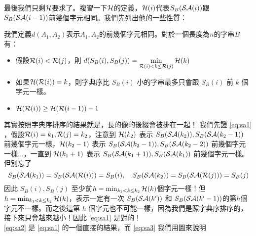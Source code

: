 \documentclass[a4paper,12pt]{book}
\begin{document}
最後我們只剩$\hei$要求了。複習一下$\hei$的定義，$\hei(i)$代表$S_{B}(\sa(i))$跟$S_{B}(\sa(i-1))$前幾個字元相同。我們先列出他的一些性質：
\begin{theorem}[定理]
  我們定義$d(A_1, A_2)$表示$A_1, A_2$的前幾個字元相同。對於一個長度為$n$的字串$B$有：
  \begin{itemize}
    \item 假設$\rank(i) < \rank(j)$，則 $ d(S_B(i), S_B(j)) = \min\limits_{\rank(i) < k \leq \rank(j)} \hei(k) $ \listeqn \label{eq:sa1}
    \item 如果$\hei(\rank(i)) = k$，則字典序比 $S_B(i)$ 小的字串最多只會跟 $S_B(i)$ 前 $k$ 個字元一樣。 \listeqn \label{eq:sa2}
    \item $\hei(\rank(i)) \geq \hei(\rank(i-1)) - 1$ \listeqn \label{eq:sa3}
  \end{itemize}
\end{theorem}
其實按照字典序排序的結果就是，長的像的後綴會被排在一起！
我們先證 \eqref{eq:sa1} ，假設$\rank(i) = k_1, \rank(j) = k_2$，注意到
$\hei(k_2)$ 表示 $S_B(\sa(k_2)), S_B(\sa(k_2-1))$ 前幾個字元一樣，$\hei(k_2 - 1)$ 表示 $S_B(\sa(k_2 - 1)), S_B(\sa(k_2-2))$ 前幾個字元一樣...，一直到 $\hei(k_1 + 1)$ 表示 $S_B(\sa(k_1 + 1)), S_B(\sa(k_1))$ 前幾個字元一樣。但別忘了
\[
  S_B(\sa(k_1)) = S_B(\sa(\rank(i))) = S_B(i),\quad S_B(\sa(k_2)) = S_B(\sa(\rank(j))) = S_B(j)
\]
因此 $S_B(i), S_B(j)$ 至少前$h = \min_{k_1 < k \leq k_2} \hei(k)$個字元一樣！但 $h = \min_{k_1 < k \leq k_2} \hei(k)$，表示一定有一次 $S_B(\sa(k')) $ 和 $S_B(\sa(k'-1))$的第$h$個字元不一樣。而之後這第 $h$ 個字元也不可能一樣，因為我們是照字典序排序的，接下來只會越來越小！因此 \eqref{eq:sa1} 是對的！\\
\eqref{eq:sa2} 是 \eqref{eq:sa1} 的一個直接的結果，而 \eqref{eq:sa3} 我們用圖來說明 \\

\begin{figure}[H]
  \centering
\caption{}
\label{fig:sa2}
\end{figure}
\end{document}

